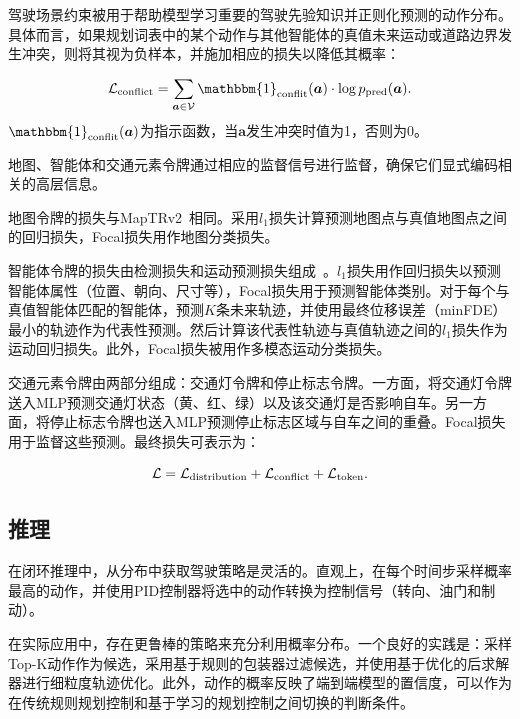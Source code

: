 \documentclass{article} %
\newcommand{\boldparagraph}[1]{\vspace{0.2cm}\noindent{\bf #1}}
\begin{document}
\boldparagraph{冲突损失。} 驾驶场景约束被用于帮助模型学习重要的驾驶先验知识并正则化预测的动作分布。具体而言，如果规划词表中的某个动作与其他智能体的真值未来运动或道路边界发生冲突，则将其视为负样本，并施加相应的损失以降低其概率：

\begin{equation}
\begin{aligned}
\mathcal{L}_{\rm conflict}
&= \sum_{\bm{a}\in\mathcal{V}}  \mathbbm{1}_{\rm conflit}(\bm{a}) \cdot \log p_{\rm pred}(\bm{a}).\\
\end{aligned}
\end{equation}
$\mathbbm{1}_{\rm conflit}(\bm{a})$为指示函数，当$\bm{a}$发生冲突时值为1，否则为0。

\boldparagraph{场景令牌损失。} 地图、智能体和交通元素令牌通过相应的监督信号进行监督，确保它们显式编码相关的高层信息。

地图令牌的损失与MapTRv2~\citep{maptrv2}相同。采用$\textit{l}_1$损失计算预测地图点与真值地图点之间的回归损失，Focal损失用作地图分类损失。

智能体令牌的损失由检测损失和运动预测损失组成~\citep{vad}。$\textit{l}_1$损失用作回归损失以预测智能体属性（位置、朝向、尺寸等），Focal损失用于预测智能体类别。对于每个与真值智能体匹配的智能体，预测$K$条未来轨迹，并使用最终位移误差（minFDE）最小的轨迹作为代表性预测。然后计算该代表性轨迹与真值轨迹之间的$\textit{l}_1$损失作为运动回归损失。此外，Focal损失被用作多模态运动分类损失。

交通元素令牌由两部分组成：交通灯令牌和停止标志令牌。一方面，将交通灯令牌送入MLP预测交通灯状态（黄、红、绿）以及该交通灯是否影响自车。另一方面，将停止标志令牌也送入MLP预测停止标志区域与自车之间的重叠。Focal损失用于监督这些预测。最终损失可表示为：

\begin{equation}
\vspace{-1mm}
\mathcal{L} =  \mathcal{L}_{\rm distribution} + \mathcal{L}_{\rm conflict} + \mathcal{L}_{\rm token}.
\vspace{-1mm}
\end{equation}


\subsection{推理}
在闭环推理中，从分布中获取驾驶策略是灵活的。直观上，在每个时间步采样概率最高的动作，并使用PID控制器将选中的动作转换为控制信号（转向、油门和制动）。

在实际应用中，存在更鲁棒的策略来充分利用概率分布。一个良好的实践是：采样Top-K动作作为候选，采用基于规则的包装器过滤候选，并使用基于优化的后求解器进行细粒度轨迹优化。此外，动作的概率反映了端到端模型的置信度，可以作为在传统规则规划控制和基于学习的规划控制之间切换的判断条件。
\end{document}
